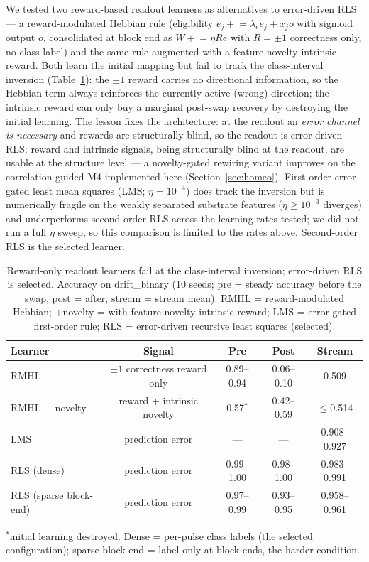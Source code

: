 \documentclass[11pt]{article}
\begin{document}
We tested two reward-based readout learners as alternatives to error-driven RLS
--- a reward-modulated Hebbian rule (eligibility $e_j \mathrel{+}= \lambda_e
e_j + x_j o$ with sigmoid output $o$, consolidated at block end as
$W \mathrel{+}= \eta R e$ with $R=\pm1$ correctness only, no class label)
\cite{hoerzer2014} and
the same rule augmented with a feature-novelty intrinsic reward. Both learn the
initial mapping but fail to track the class-interval inversion
(Table~\ref{tab:neg}): the $\pm1$ reward carries no directional information, so
the Hebbian term always reinforces the currently-active (wrong) direction; the
intrinsic reward can only buy a marginal post-swap recovery by destroying the
initial learning. The lesson fixes the architecture: at the readout an
\emph{error channel is necessary} and rewards are structurally blind, so the
readout is error-driven RLS; reward and intrinsic signals, being structurally
blind at the readout, are usable at the structure level --- a novelty-gated
rewiring variant improves on the correlation-guided M4 implemented here
(Section~\ref{sec:homeo}). First-order error-gated least mean squares (LMS;
$\eta=10^{-4}$) does track the inversion
but is numerically fragile on the weakly separated substrate features
($\eta\ge10^{-3}$ diverges) and underperforms second-order RLS across the
learning rates tested; we did not run a full $\eta$ sweep, so this comparison
is limited to the rates above. Second-order RLS is the selected learner.

\begin{table}[t]
\centering
\caption{Reward-only readout learners fail at the class-interval inversion;
error-driven RLS is selected. Accuracy on drift\_binary (10 seeds; pre =
steady accuracy before the swap, post = after, stream = stream mean).
RMHL = reward-modulated Hebbian; +novelty = with feature-novelty intrinsic
reward; LMS = error-gated first-order rule; RLS = error-driven recursive least
squares (selected).}
\label{tab:neg}
\begin{tabular}{lcccc}
\toprule
Learner & Signal & Pre & Post & Stream \\
\midrule
RMHL          & $\pm1$ correctness reward only      & 0.89--0.94 & 0.06--0.10 & 0.509 \\
RMHL + novelty & reward + intrinsic novelty        & 0.57$^*$   & 0.42--0.59 & $\le$0.514 \\
LMS           & prediction error                    & ---        & ---        & 0.908--0.927 \\
RLS (dense)   & prediction error                    & 0.99--1.00 & 0.98--1.00 & 0.983--0.991 \\
RLS (sparse block-end) & prediction error   & 0.97--0.99 & 0.93--0.95 & 0.958--0.961 \\
\bottomrule
\end{tabular}

\medskip
\footnotesize{$^*$initial learning destroyed. Dense = per-pulse class labels
(the selected configuration); sparse block-end = label only at block ends, the
harder condition.}
\end{table}
\end{document}
